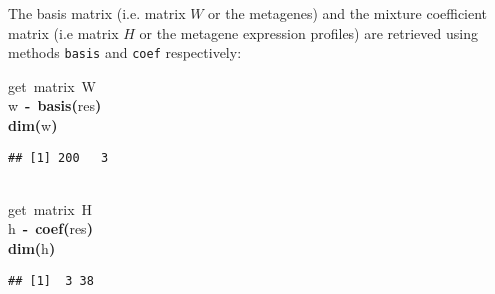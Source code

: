 \documentclass[a4paper]{article}\usepackage{graphicx, color}
\makeatletter
\newcommand{\hlfunctioncall}[1]{\textcolor[rgb]{0.501960784313725,0,0.329411764705882}{\textbf{#1}}}%
\newcommand{\hlkeyword}[1]{\textcolor[rgb]{0,0,0}{\textbf{#1}}}%
\newcommand{\hlcomment}[1]{\textcolor[rgb]{0.180392156862745,0.6,0.341176470588235}{#1}}%
\newcommand{\hlassignement}[1]{\textcolor[rgb]{0,0,0}{\textbf{#1}}}%
\newcommand{\hlsymbol}[1]{\textcolor[rgb]{0,0,0}{#1}}%
\newcommand{\hlstd}[1]{\textcolor[rgb]{0,0,0}{#1}}%
\newenvironment{kframe}{%
 \def\FrameCommand##1{\hskip\@totalleftmargin \hskip-\fboxsep
 \colorbox{shadecolor}{##1}\hskip-\fboxsep
     \hskip-\linewidth \hskip-\@totalleftmargin \hskip\columnwidth}%
 \MakeFramed {\advance\hsize-\width
   \@totalleftmargin\z@ \linewidth\hsize
   \@setminipage}}%
 {\par\unskip\endMakeFramed}
\newenvironment{knitrout}{}{} %
\let\code=\texttt
\makeatother
\begin{document}
The basis matrix (i.e. matrix $W$ or the metagenes) and the mixture coefficient matrix (i.e matrix $H$ or the metagene expression profiles) are retrieved using methods \code{basis} and \code{coef} respectively:

\begin{knitrout}
\color{fgcolor}\begin{kframe}
\begin{flushleft}
\ttfamily\noindent
\hlcomment{\usebox{\hlnormalsizeboxhash}{\ }get{\ }matrix{\ }W}\hspace*{\fill}\\
\hlstd{}\hlsymbol{w}{\ }\hlassignement{\usebox{\hlnormalsizeboxlessthan}-}{\ }\hlfunctioncall{basis}\hlkeyword{(}\hlsymbol{res}\hlkeyword{)}\hspace*{\fill}\\
\hlstd{}\hlfunctioncall{dim}\hlkeyword{(}\hlsymbol{w}\hlkeyword{)}\mbox{}
\normalfont
\end{flushleft}
\begin{verbatim}
## [1] 200   3
\end{verbatim}
\begin{flushleft}
\ttfamily\noindent
\hspace*{\fill}\\
\hlstd{}\hlcomment{\usebox{\hlnormalsizeboxhash}{\ }get{\ }matrix{\ }H}\hspace*{\fill}\\
\hlstd{}\hlsymbol{h}{\ }\hlassignement{\usebox{\hlnormalsizeboxlessthan}-}{\ }\hlfunctioncall{coef}\hlkeyword{(}\hlsymbol{res}\hlkeyword{)}\hspace*{\fill}\\
\hlstd{}\hlfunctioncall{dim}\hlkeyword{(}\hlsymbol{h}\hlkeyword{)}\mbox{}
\normalfont
\end{flushleft}
\begin{verbatim}
## [1]  3 38
\end{verbatim}
\end{kframe}
\end{knitrout}
\end{document}
